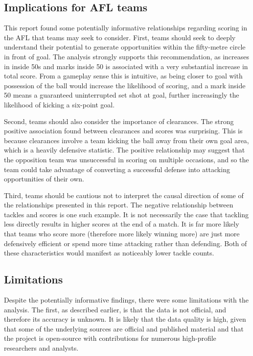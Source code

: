 \documentclass{article}
\begin{document}
\hypertarget{implications-for-afl-teams}{%
\subsection{Implications for AFL teams}\label{implications-for-afl-teams}}

This report found some potentially informative relationships regarding scoring in the AFL that teams may seek to consider. First, teams should seek to deeply understand their potential to generate opportunities within the fifty-metre circle in front of goal. The analysis strongly supports this recommendation, as increases in inside 50s and marks inside 50 is associated with a very substantial increase in total score. From a gameplay sense this is intuitive, as being closer to goal with possession of the ball would increase the likelihood of scoring, and a mark inside 50 means a guaranteed uninterrupted set shot at goal, further increasingly the likelihood of kicking a six-point goal.

Second, teams should also consider the importance of clearances. The strong positive association found between clearances and scores was surprising. This is because clearances involve a team kicking the ball away from their own goal area, which is a heavily defensive statistic. The positive relationship may suggest that the opposition team was unsuccessful in scoring on multiple occasions, and so the team could take advantage of converting a successful defense into attacking opportunities of their own.

Third, teams should be cautious not to interpret the causal direction of some of the relationships presented in this report. The negative relationship between tackles and scores is one such example. It is not necessarily the case that tackling less directly results in higher scores at the end of a match. It is far more likely that teams who score more (therefore more likely winning more) are just more defensively efficient or spend more time attacking rather than defending. Both of these characteristics would manifest as noticeably lower tackle counts.

\hypertarget{limitations}{%
\subsection{Limitations}\label{limitations}}

Despite the potentially informative findings, there were some limitations with the analysis. The first, as described earlier, is that the data is not official, and therefore its accuracy is unknown. It is likely that the data quality is high, given that some of the underlying sources are official and published material and that the project is open-source with contributions for numerous high-profile researchers and analysts.
\end{document}
